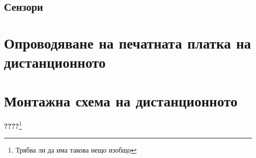 \subsection{Сензори}


\section{Опроводяване на печатната платка на дистанционното}


\section{Монтажна схема на дистанционното}

\textbf{????}\footnote{Трябва ли да има такова нещо изобщо}